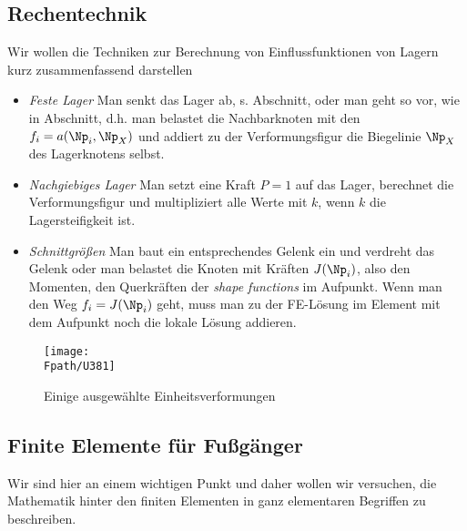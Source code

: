 {\textcolor{blau2}{\section{Rechentechnik}}\label{Korrektur36}
Wir wollen die Techniken zur Berechnung von Einflussfunktionen von Lagern kurz zusammenfassend darstellen

\begin{itemize}
  \item {\em Feste Lager\/} Man senkt das Lager ab, s. Abschnitt, oder man geht so vor, wie in Abschnitt, d.h. man belastet die Nachbarknoten mit den $f_i = a(\Np_i,\Np_X)$ und addiert zu der Verformungsfigur die Biegelinie $\Np_X$ des Lagerknotens selbst.
  \item {\em Nachgiebiges Lager\/} Man setzt eine Kraft $P = 1$ auf das Lager, berechnet die Verformungsfigur und multipliziert alle Werte mit $k$, wenn $k$ die Lagersteifigkeit ist.
  \item {\em Schnittgr\"{o}{\ss}en\/} Man baut ein entsprechendes Gelenk ein und verdreht das Gelenk oder man belastet die Knoten mit Kr\"{a}ften $J(\Np_i)$, also den Momenten, den Querkr\"{a}ften der {\em shape functions\/} im Aufpunkt. Wenn man den Weg $f_i = J(\Np_i)$ geht, muss man zu der FE-L\"{o}sung im Element mit dem Aufpunkt noch die lokale L\"{o}sung addieren.
\end{itemize}

\begin{figure}[tbp]
\centering
\if {} \sidecaption \fi
\texttt{[image: \\Fpath/U381]}
\caption{Einige ausgew\"{a}hlte Einheitsverformungen}
\label{U381}%
\end{figure}%

\textcolor{blau2}{\section{Finite Elemente f\"{u}r Fu{\ss}g\"{a}nger}}
Wir sind hier an einem wichtigen Punkt und daher wollen wir versuchen, die Mathematik hinter den finiten Elementen in ganz elementaren Begriffen zu beschreiben.

}

